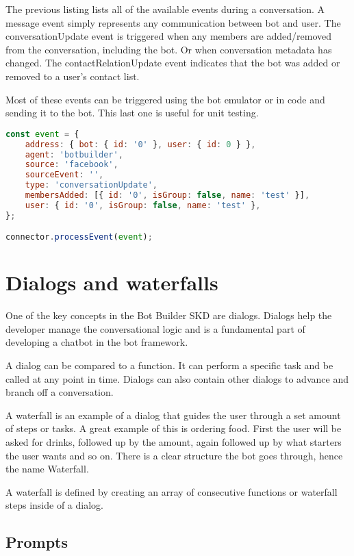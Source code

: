 The previous listing lists all of the available events during a conversation. A message event simply represents any communication between bot and user. The conversationUpdate event is triggered when any members are added/removed from the conversation, including the bot. Or when conversation metadata has changed. The contactRelationUpdate event indicates that the bot was added or removed to a user's contact list.

Most of these events can be triggered using the bot emulator or in code and sending it to the bot. This last one is useful for unit testing.

\begin{lstlisting}[language=JavaScript,caption=Sending a mock event to the bot,label=listing:botframework-mock-event]
const event = {
	address: { bot: { id: '0' }, user: { id: 0 } },
	agent: 'botbuilder',
	source: 'facebook',
	sourceEvent: '',
	type: 'conversationUpdate',
	membersAdded: [{ id: '0', isGroup: false, name: 'test' }],
	user: { id: '0', isGroup: false, name: 'test' },
};

connector.processEvent(event);
\end{lstlisting}

\section{Dialogs and waterfalls}

One of the key concepts in the Bot Builder SKD are dialogs. Dialogs help the developer manage the conversational logic and is a fundamental part of developing a chatbot in the bot framework.

A dialog can be compared to a function. It can perform a specific task and be called at any point in time. Dialogs can also contain other dialogs to advance and branch off a conversation.

A waterfall is an example of a dialog that guides the user through a set amount of steps or tasks. A great example of this is ordering food. First the user will be asked for drinks, followed up by the amount, again followed up by what starters the user wants and so on. There is a clear structure the bot goes through, hence the name Waterfall.

A waterfall is defined by creating an array of consecutive functions or waterfall steps inside of a dialog.

\subsection{Prompts}

